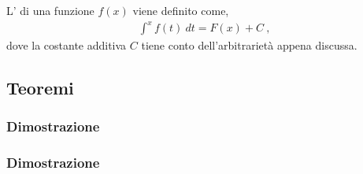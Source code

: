 \documentclass[letterpaper,10pt,english]{jupyterBook}
\begin{document}
\sphinxAtStartPar
L’ di una funzione \(f(x)\) viene definito come,
\begin{equation*}
\begin{split}\int^x f(t) \ dt = F(x) + C \ ,\end{split}
\end{equation*}
\sphinxAtStartPar
dove la costante additiva \(C\) tiene conto dell’arbitrarietà appena discussa.


\subsection{Teoremi}
\label{\detokenize{ch/infinitesimal_calculus/integrals:teoremi}}\label{\detokenize{ch/infinitesimal_calculus/integrals:infinitesimal-calculus-integrals-thm}}

\label{\detokenize{ch/infinitesimal_calculus/integrals:infinitesimal-calculus-integrals-thm-avg}}\subsubsection*{Dimostrazione}

\sphinxAtStartPar
{}


\label{\detokenize{ch/infinitesimal_calculus/integrals:infinitesimal-calculus-integrals-thm-fund}}\subsubsection*{Dimostrazione}
\end{document}
